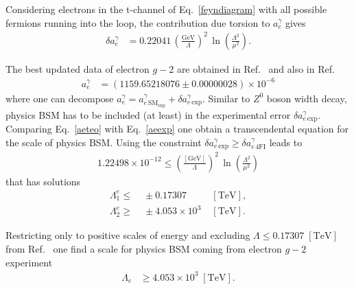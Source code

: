 Considering electrons in the t-channel of Eq.~\eqref{feyndiagram} with all possible fermions running into the loop, the contribution due torsion to $a_e^\gamma$ gives
\begin{align}
\label{aeteo}
 \delta a_e^\gamma &= 0.22041\,\left(\frac{\text{GeV}}{\Lambda}\right)^2\,\ln\left(\frac{\Lambda^2}{\mu^2}\right).
\end{align}

The best updated data of electron $g-2$ are obtained in Ref.~\cite{Hanneke:2008tm} and also in Ref.~\cite{Beringer:1900zz}
\begin{align}
\label{aeexp}
 a_e^\gamma &= (1159.65218076\pm0.00000028)\times10^{-6} 
\end{align}
where one can decompose $a_e^\gamma = a_{e\,\text{SM}_\text{exp}}^\gamma + \delta a_{e\,\text{exp}}^\gamma$. Similar to $Z^0$ boson width decay, physics BSM has to be included (at least) in the experimental error $\delta a_{e\,\text{exp}}^\gamma$. Comparing Eq.~\eqref{aeteo} with Eq.~\eqref{aeexp} one obtain a transcendental equation for the scale of physics BSM. Using the constraint $\delta a_{e\,\text{exp}}^\gamma\geq\delta a_{e\,\text{4FI}}^\gamma$ leads to
\begin{align}
1.22498\times10^{-12} \leq \left(\frac{[\text{GeV}]}{\Lambda}\right)^2\,\ln\left(\frac{\Lambda^2}{\mu^2}\right) 
\end{align}
that has solutions
\begin{eqnarray}
 \label{lowscalefromgm2}
 \Lambda_1^{e} \leq&\; \pm0.17307\;&[\text{TeV}], \\
 \label{upscalefromgm2}
 \Lambda_2^{e} \geq&\; \pm4.053\times10^3\;&[\text{TeV}].
\end{eqnarray}

Restricting only to positive scales of energy and excluding $\Lambda\leq0.17307\;[\text{TeV}]$ from Ref.~\cite{Chatrchyan:2013muj} one find a scale for physics BSM coming from electron $g-2$ experiment 
\begin{align}
 \Lambda_e &\geq 4.053\times10^3\;[\text{TeV}].
\end{align}
